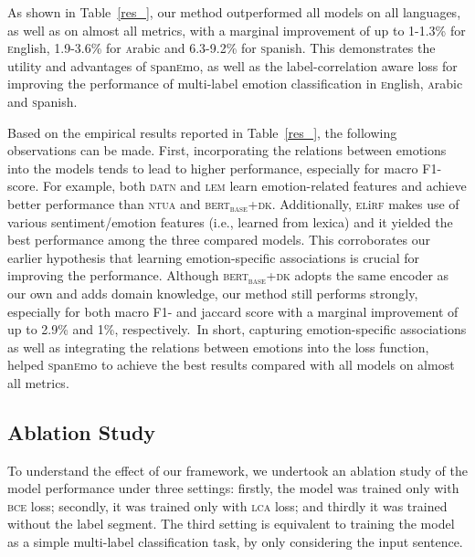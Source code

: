 \documentclass[11pt,a4paper]{article}
\begin{document}
As shown in Table~\ref{res_}, our method outperformed all models on all languages, as well as on almost all metrics, with a marginal improvement of up to 1-1.3\% for \textsc{e}nglish, 1.9-3.6\% for \textsc{a}rabic and 6.3-9.2\% for \textsc{s}panish. This demonstrates the utility and advantages of \textsc{s}pan\textsc{e}mo, as well as the label-correlation aware loss for improving the performance of multi-label emotion classification in \textsc{e}nglish, \textsc{a}rabic and \textsc{s}panish.

Based on the empirical results reported in Table~\ref{res_}, the following observations can be made. First, incorporating the relations between emotions into the models tends to lead to higher performance, especially for macro F1-score. For example, both \textsc{datn} and \textsc{lem} learn emotion-related features and achieve better performance than \textsc{ntua} and \textsc{bert$_{\text{base}}$}+\textsc{dk}. Additionally, \textsc{el}i\textsc{rf} makes use of various sentiment/emotion features (i.e., learned from lexica) and it yielded the best performance among the three compared models. This corroborates our earlier hypothesis that learning emotion-specific associations is crucial for improving the performance. Although \textsc{bert$_{\text{base}}$}+\textsc{dk} adopts the same encoder as our own and adds domain knowledge, our method still performs strongly, especially for both macro F1- and jaccard score with a marginal improvement of up to 2.9\% and 1\%, respectively.~In short, capturing emotion-specific associations as well as integrating the relations between emotions into the loss function, helped \textsc{s}pan\textsc{e}mo to achieve the best results compared with all models on almost all metrics.  


\subsection{Ablation Study}\label{ablation}



To understand the effect of our framework, we undertook an ablation study of the model performance under three settings: firstly, the model was trained only with \textsc{bce} loss; secondly, it was trained only with \textsc{lca} loss; and thirdly it was trained without the label segment. The third setting is equivalent to training the model as a simple multi-label classification task, by only considering the input sentence.  
\end{document}

